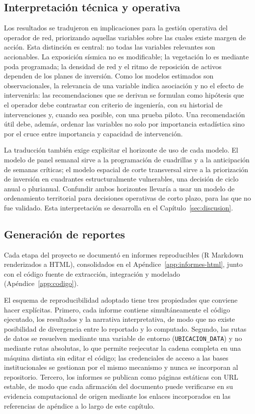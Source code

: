 \subsection{Interpretación técnica y operativa}
\label{sec:interpretacion_tecnica_operativa}
Los resultados se tradujeron en implicaciones para la gestión operativa del operador de red, priorizando aquellas variables sobre las cuales existe margen de acción. Esta distinción es central: no todas las variables relevantes son accionables. La exposición sísmica no es modificable; la vegetación lo es mediante poda programada; la densidad de red y el ritmo de reposición de activos dependen de los planes de inversión. Como los modelos estimados son observacionales, la relevancia de una variable indica asociación y no el efecto de intervenirla: las recomendaciones que se derivan se formulan como hipótesis que el operador debe contrastar con criterio de ingeniería, con su historial de intervenciones y, cuando sea posible, con una prueba piloto. Una recomendación útil debe, además, ordenar las variables no solo por importancia estadística sino por el cruce entre importancia y capacidad de intervención.

La traducción también exige explicitar el horizonte de uso de cada modelo. El modelo de panel semanal sirve a la programación de cuadrillas y a la anticipación de semanas críticas; el modelo espacial de corte transversal sirve a la priorización de inversión en cuadrantes estructuralmente vulnerables, una decisión de ciclo anual o plurianual. Confundir ambos horizontes llevaría a usar un modelo de ordenamiento territorial para decisiones operativas de corto plazo, para las que no fue validado. Esta interpretación se desarrolla en el Capítulo~\ref{sec:discusion}.

\subsection{Generación de reportes}
\label{sec:generacion_reportes}
Cada etapa del proyecto se documentó en informes reproducibles (R Markdown renderizados a HTML), consolidados en el Apéndice~\ref{app:informes-html}, junto con el código fuente de extracción, integración y modelado (Apéndice~\ref{app:codigo}).

El esquema de reproducibilidad adoptado tiene tres propiedades que conviene hacer explícitas. Primero, cada informe contiene simultáneamente el código ejecutado, los resultados y la narrativa interpretativa, de modo que no existe posibilidad de divergencia entre lo reportado y lo computado. Segundo, las rutas de datos se resuelven mediante una variable de entorno (\texttt{UBICACION\_DATA}) y no mediante rutas absolutas, lo que permite reejecutar la cadena completa en una máquina distinta sin editar el código; las credenciales de acceso a las bases institucionales se gestionan por el mismo mecanismo y nunca se incorporan al repositorio. Tercero, los informes se publican como páginas estáticas con URL estable, de modo que cada afirmación del documento puede verificarse en su evidencia computacional de origen mediante los enlaces incorporados en las referencias de apéndice a lo largo de este capítulo.

